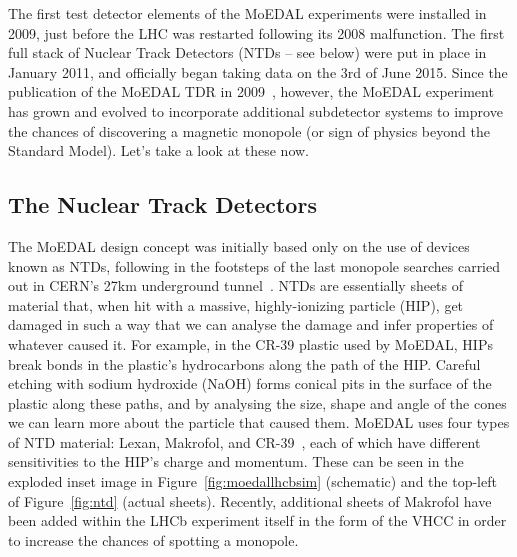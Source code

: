 The first test detector elements of the \ac{MoEDAL} experiments were
installed in 2009, just before the \ac{LHC} was restarted following its
2008 malfunction.
%
The first full stack of Nuclear Track Detectors (NTDs – see below) were
put in place in January 2011, and officially began taking data on the
3rd of June 2015.
%
Since the publication of the \ac{MoEDAL} \ac{TDR} in 2009~\cite{MoEDAL2009},
however, the \ac{MoEDAL} experiment has grown and evolved to incorporate
additional subdetector systems to improve the chances of discovering a
magnetic monopole (or sign of physics beyond the Standard Model).
Let's take a look at these now.


\subsection{The Nuclear Track Detectors}
\label{sec:ntds}
The \ac{MoEDAL} design concept was initially based only on the use of
devices known as \acfp{NTD}, following in the footsteps of the last monopole
searches carried out in CERN's 27km underground tunnel~\cite{Pinfold2009}.
\acp{NTD} are essentially sheets of material that, when hit with a massive,
highly-ionizing particle (\acs{HIP}), get damaged in such a way that we can 
analyse the damage and infer properties of whatever caused it.
%
For example, in the CR-39 \textregistered{} plastic used by \ac{MoEDAL},
\acp{HIP} break bonds in the plastic's hydrocarbons along the path of
the \ac{HIP}.
%
Careful etching with sodium hydroxide (NaOH) forms conical pits in the 
surface of the plastic along these paths, and by analysing the size, 
shape and angle of the cones we can learn more about the particle that 
caused them. \ac{MoEDAL} uses four types of \ac{NTD} material:
Lexan, Makrofol, and CR-39~\textregistered, each of which have different
sensitivities to the \ac{HIP}'s charge and momentum.
These can be seen in the exploded inset image in Figure~\ref{fig:moedallhcbsim}
(schematic) and the top-left of Figure~\ref{fig:ntd} (actual sheets).
Recently, additional sheets of Makrofol have been added within the \ac{LHCb}
experiment itself in the form of the \ac{VHCC} in order to increase the 
chances of spotting a monopole.

